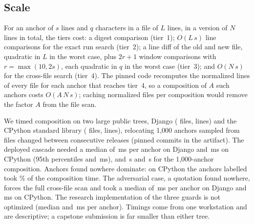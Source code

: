 \subsection{Scale}\label{sec:scale}
For an anchor of $s$ lines and $q$ characters in a file of $L$ lines, in a version of $N$ lines in total, the tiers cost: a digest comparison (tier~1); $O(L\,s)$ line comparisons for the exact run search (tier~2); a line diff of the old and new file, quadratic in $L$ in the worst case, plus $2r+1$ window comparisons with $r=\max(10,2s)$, each quadratic in $q$ in the worst case (tier~3); and $O(N\,s)$ for the cross-file search (tier~4). The pinned code recomputes the normalized lines of every file for each anchor that reaches tier~4, so a composition of $A$ such anchors costs $O(A\,N\,s)$; caching normalized files per composition would remove the factor $A$ from the file scan.

We timed composition on two large public trees, Django (\bTwoDjFiles{} files, \bTwoDjLines{} lines) and the CPython standard library (\bTwoPyFiles{} files, \bTwoPyLines{} lines), relocating 1,000 anchors sampled from files changed between consecutive releases (pinned commits in the artifact). The deployed cascade needed a median of \bTwoDjDepAnchorMed{}\,ms per anchor on Django and \bTwoPyDepAnchorMed{}\,ms on CPython (95th percentiles \bTwoDjDepAnchorPninetyfive{} and \bTwoPyDepAnchorPninetyfive{}\,ms), and \bTwoDjDepComposeThousand{}\,s and \bTwoPyDepComposeThousand{}\,s for the 1,000-anchor composition. Anchors found nowhere dominate: on CPython the \bTwoPyRemovedCount{} anchors labelled  took \bTwoPyRemovedShare\% of the composition time. The adversarial case, a quotation found nowhere, forces the full cross-file scan and took a median of \bTwoDjDepAbsentMed{}\,ms per anchor on Django and \bTwoPyDepAbsentMed{}\,ms on CPython. The research implementation of the three guards is not optimized (median \bTwoDjAllAnchorMed{} and \bTwoPyAllAnchorMed{}\,ms per anchor). Timings come from one workstation and are descriptive; a capstone submission is far smaller than either tree.
